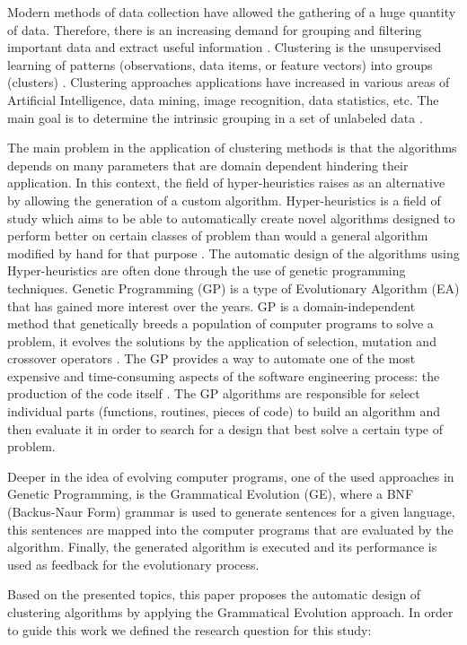 \documentclass[journal]{IEEEtran}
\begin{document}
	Modern methods of data collection have allowed the gathering of a huge quantity of data. Therefore, there is an increasing demand for grouping and filtering important data and extract useful information \cite{ahalya2015data}. Clustering is the unsupervised learning of patterns (observations, data items, or feature vectors) into groups (clusters) \cite{jain1988algorithms}. Clustering approaches applications have increased in various areas of Artificial Intelligence, data mining, image recognition, data statistics, etc. The main goal is to determine the intrinsic grouping in a set of unlabeled data \cite{ahalya2015data}.
	

	The main problem in the application of clustering methods is that the algorithms depends on many parameters that are domain dependent hindering their application. In this context, the field of hyper-heuristics raises as an alternative by allowing the generation of a custom algorithm. Hyper-heuristics is a field of study which aims to be able to automatically create novel algorithms designed to perform better on certain classes of problem than would a general algorithm modified by hand for that purpose \cite{harris2015comparison}. The automatic design of the algorithms using Hyper-heuristics are often done through the use of genetic programming techniques. Genetic Programming (GP) is a type of Evolutionary Algorithm (EA) that has gained more interest over the years. GP is a domain-independent method that genetically breeds a population of computer programs to solve a problem, it evolves the solutions by the application of selection, mutation and crossover operators \cite{poli2014genetic}. The GP provides a way to automate one of the most expensive and time-consuming aspects of the software engineering process: the production of the code itself \cite{langdon2013optimising}. The GP algorithms are responsible for select individual parts (functions, routines, pieces of code) to build an algorithm and then evaluate it in order to search for a design that best solve a certain type of problem.
	
	Deeper in the idea of evolving computer programs, one of the used approaches in Genetic Programming, is the Grammatical Evolution (GE), where a BNF (Backus-Naur Form) grammar is used to generate sentences for a given language, this sentences are mapped into the computer programs that are evaluated by the algorithm. Finally, the generated algorithm is executed and its performance is used as feedback for the evolutionary process.
	
	Based on the presented topics, this paper proposes the automatic design of clustering algorithms by applying the Grammatical Evolution approach. In order to guide this work we defined the research question for this study:
	
\end{document}
